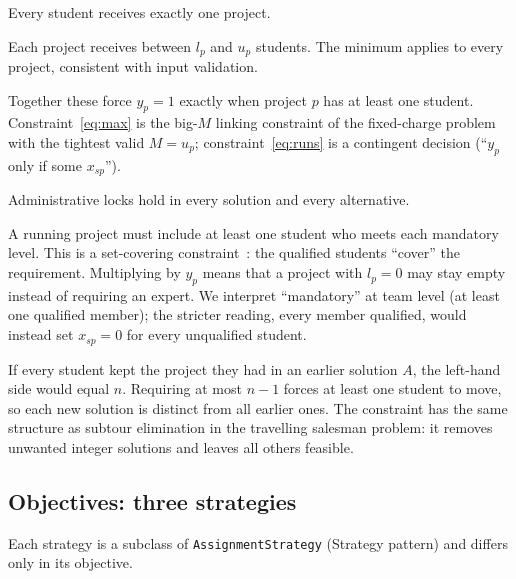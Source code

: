 \documentclass[11pt,a4paper]{article}
\newcommand{\code}[1]{\texttt{#1}}
\begin{document}
\begin{description}[leftmargin=0pt,font=\normalfont\bfseries]
  \item[\eqref{eq:one} One project per student.] Every student receives
        exactly one project.
  \item[\eqref{eq:min}--\eqref{eq:max} Capacity.] Each project receives
        between $l_p$ and $u_p$ students. The minimum applies to every project,
        consistent with input validation.
  \item[\eqref{eq:max}--\eqref{eq:runs} Linking $y_p$ to $x_{sp}$.] Together
        these force $y_p = 1$ exactly when project $p$ has at least one
        student. Constraint~\eqref{eq:max} is the big-$M$ linking constraint
        of the fixed-charge problem~\cite[Ch.~12.3]{ior} with the tightest
        valid $M = u_p$; constraint~\eqref{eq:runs} is a contingent decision
        (``$y_p$ only if some $x_{sp}$'').
  \item[\eqref{eq:fixed} Fixed assignments.] Administrative locks hold in
        every solution and every alternative.
  \item[\eqref{eq:mand} Mandatory skills.] A running project must include
        at least one student who meets each mandatory level. This is a
        set-covering constraint~\cite[Ch.~12]{ior}: the qualified students
        ``cover'' the requirement. Multiplying by $y_p$ means that a project
        with $l_p = 0$ may stay empty instead of requiring an expert. We
        interpret ``mandatory'' at team level (at least one qualified member);
        the stricter reading, every member qualified, would instead set
        $x_{sp} = 0$ for every unqualified student.
  \item[\eqref{eq:nogood} No-good cuts.] If every student kept the project
        they had in an earlier solution $A$, the left-hand side would equal
        $n$. Requiring at most $n - 1$ forces at least one student to move, so
        each new solution is distinct from all earlier ones. The constraint
        has the same structure as subtour elimination in the travelling
        salesman problem: it removes unwanted integer solutions and leaves all
        others feasible.
\end{description}

\subsection{Objectives: three strategies}
\label{sec:obj}

Each strategy is a subclass of \code{AssignmentStrategy} (Strategy pattern)
and differs only in its objective.
\end{document}
